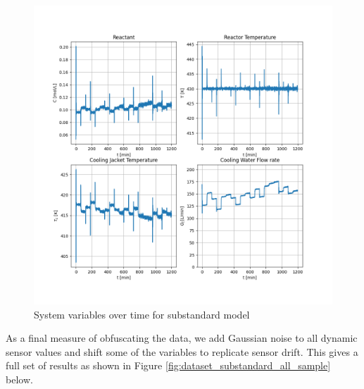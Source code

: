 \documentclass{article}
\begin{document}
\begin{figure}[H]
	\centering
	\includegraphics[width=1\textwidth]{img/dataset_substandard}
	\caption{System variables over time for substandard model}
	\label{fig:dataset_substandard_sample}
\end{figure}

As a final measure of obfuscating the data, we add Gaussian noise to all dynamic sensor values and shift some of the variables to replicate sensor drift. This gives a full set of results as shown in Figure \ref{fig:dataset_substandard_all_sample} below. 
\end{document}
